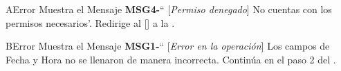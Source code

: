 \begin{UCtrayectoriaA}{A}{Error}
			\UCpaso Muestra el Mensaje {\bf MSG4-}`` [{\em Permiso denegado}] No cuentas con los permisos necesarios'.
			\UCpaso  Redirige al [\UCactor] a la .
		\end{UCtrayectoriaA}

\begin{UCtrayectoriaA}{B}{Error}
			\UCpaso Muestra el Mensaje {\bf MSG1-}`` [{\em Error en la operación}] Los campos de Fecha y Hora no se llenaron de manera incorrecta.
			\UCpaso Continúa en el paso 2 del .
		\end{UCtrayectoriaA}
